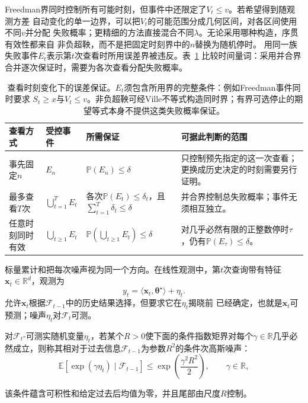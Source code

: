 Freedman界同时控制所有可能时刻，但事件中还限定了$V_t\leq v$。若希望得到随观测方差
自动变化的单一边界，可以把$V_t$的可能范围分成几何区间，对各区间使用不同$v$并分配
失败概率；更精细的方法直接混合不同$\lambda$。无论采用哪种构造，序贯有效性都来自
非负超鞅，而不是把固定时刻界中的$n$替换为随机停时。
用同一族失败事件\(E_t\)表示第\(t\)次查看时所用误差界被违反。表~\ref{tab:rv-viewing-time-guarantees}
比较时间量词：采用并合界合并逐次保证时，需要为各次查看分配失败概率。
\begin{table}[htbp]
  \centering\small
  \begin{tabularx}{\linewidth}{p{22mm}p{39mm}XX}
    \toprule
    查看方式 & 受控事件 & 所需保证 & 可据此判断的范围\\
    \midrule
    事先固定\(n\) & \(E_n\) & \(\mathbb P(E_n)\leq\delta\) & 只控制预先指定的这一次查看；更换成历史决定的时刻需要另行证明。\\
    最多查看\(T\)次 & \(\bigcup_{t=1}^T E_t\) & 各次\(\mathbb P(E_t)\leq\delta_t\)，且\(\sum_{t=1}^T\delta_t\leq\delta\) & 并合界控制总失败概率；事件无须相互独立。\\
    任意时刻同时有效 & \(\bigcup_{t\geq1}E_t\) & \(\mathbb P(\bigcup_{t\geq1}E_t)\leq\delta\) & 对几乎必然有限的正整数停时\(\tau\)，仍有\(\mathbb P(E_\tau)\leq\delta\)。\\
    \bottomrule
  \end{tabularx}
  \caption{查看时刻变化下的误差保证。\(E_t\)须包含所用界的完整条件：例如Freedman事件同时要求
  \(S_t\geq x\)与\(V_t\leq v\)。非负超鞅可经Ville不等式构造同时界；有界可选停止的期望等式本身不提供这类失败概率保证。}
  \label{tab:rv-viewing-time-guarantees}
\end{table}

标量累计和把每次噪声视为同一个方向。在线性观测中，第$t$次查询带有特征
$\bm{x}_t\in\mathbb{R}^d$，观测为
\begin{equation}
  y_t=\langle\bm{x}_t,\bm{\theta}^{\star}\rangle+\eta_t.
  \label{eq:stoch-adaptive-linear-observation}
\end{equation}
允许$\bm{x}_t$根据$\mathcal{F}_{t-1}$中的历史结果选择，但要求它在$\eta_t$揭晓前
已经确定，也就是$\bm{x}_t$可预测；噪声$\eta_t$对$\mathcal{F}_t$可测。
\begin{definition}[条件次高斯噪声]
  \label{def:stoch-conditional-subgaussian}
对\(\mathcal F_t\)-可测实随机变量\(\eta_t\)，若某个$R>0$使下面的条件指数矩界对每个\(\gamma\in\mathbb R\)几乎必然成立，则称其相对于过去信息\(\mathcal F_{t-1}\)为参数\(R^2\)的条件次高斯噪声：
\begin{equation}
  \mathbb{E}[
    \exp(\gamma\eta_t)
    \mid\mathcal{F}_{t-1}]
  \leq
  \exp\left(\frac{\gamma^2R^2}{2}\right),
  \qquad \gamma\in\mathbb{R},
  \label{eq:stoch-conditional-subgaussian}
\end{equation}
\end{definition}
该条件蕴含可积性和给定过去后均值为零，并且尾部由尺度$R$控制。

